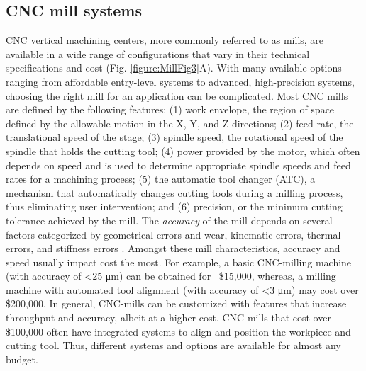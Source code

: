 \subsection{CNC mill systems}
CNC vertical machining centers, more commonly referred to as mills, are available in a wide range of configurations that vary in their technical specifications and cost (Fig. \ref{figure:MillFig3}A). With many available options ranging from affordable entry-level systems to advanced, high-precision systems, choosing the right mill for an application can be complicated. Most CNC mills are defined by the following features: (1) work envelope, the region of space defined by the allowable motion in the X, Y, and Z directions; (2) feed rate, the translational speed of the stage; (3) spindle speed, the rotational speed of the spindle that holds the cutting tool; (4) power provided by the motor, which often depends on speed and is used to determine appropriate spindle speeds and feed rates for a machining process; (5) the automatic tool changer (ATC), a mechanism that automatically changes cutting tools during a milling process, thus eliminating user intervention; and (6) precision, or the minimum cutting tolerance achieved by the mill. The \textit{accuracy} of the mill depends on several factors categorized by geometrical errors and wear, kinematic errors, thermal errors, and stiffness errors \cite{Lamikiz2008}. Amongst these mill characteristics, accuracy and speed usually impact cost the most. For example, a basic CNC-milling machine (with accuracy of <25 μm) can be obtained for ~\$15,000, whereas, a milling machine with automated tool alignment (with accuracy of <3 μm) may cost over \$200,000. In general, CNC-mills can be customized with features that increase throughput and accuracy, albeit at a higher cost. CNC mills that cost over \$100,000 often have integrated systems to align and position the workpiece and cutting tool.  Thus, different systems and options are available for almost any budget.


